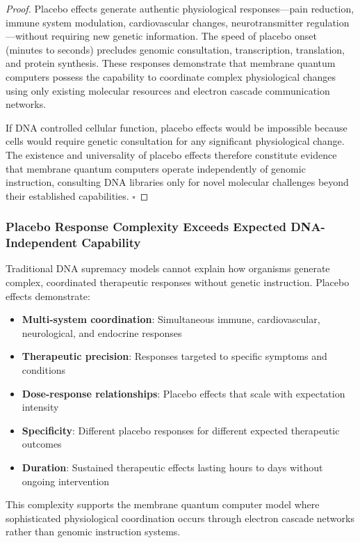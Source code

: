\documentclass[12pt,a4paper]{article}
\begin{document}
\begin{proof}
Placebo effects generate authentic physiological responses—pain reduction, immune system modulation, cardiovascular changes, neurotransmitter regulation—without requiring new genetic information. The speed of placebo onset (minutes to seconds) precludes genomic consultation, transcription, translation, and protein synthesis. These responses demonstrate that membrane quantum computers possess the capability to coordinate complex physiological changes using only existing molecular resources and electron cascade communication networks.

If DNA controlled cellular function, placebo effects would be impossible because cells would require genetic consultation for any significant physiological change. The existence and universality of placebo effects therefore constitute evidence that membrane quantum computers operate independently of genomic instruction, consulting DNA libraries only for novel molecular challenges beyond their established capabilities. $\square$
\end{proof}

\subsubsection{Placebo Response Complexity Exceeds Expected DNA-Independent Capability}

Traditional DNA supremacy models cannot explain how organisms generate complex, coordinated therapeutic responses without genetic instruction. Placebo effects demonstrate:

\begin{itemize}
\item \textbf{Multi-system coordination}: Simultaneous immune, cardiovascular, neurological, and endocrine responses
\item \textbf{Therapeutic precision}: Responses targeted to specific symptoms and conditions
\item \textbf{Dose-response relationships}: Placebo effects that scale with expectation intensity
\item \textbf{Specificity}: Different placebo responses for different expected therapeutic outcomes
\item \textbf{Duration}: Sustained therapeutic effects lasting hours to days without ongoing intervention
\end{itemize}

This complexity supports the membrane quantum computer model where sophisticated physiological coordination occurs through electron cascade networks rather than genomic instruction systems.
\end{document}
